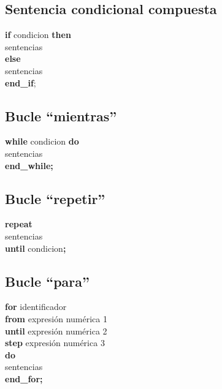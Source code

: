 \documentclass[a4paper,12pt,twoside,openright]{report}
\begin{document}
    \subsection{Sentencia condicional compuesta}
    \textbf{if} condicion \textbf{then}\\
      sentencias\\
    \textbf{else}\\
      sentencias\\
    \textbf{end\_if};
    \subsection{Bucle ``mientras''}
    \textbf{while} condicion \textbf{do}\\
      sentencias\\
    \textbf{end\_while;}\\
    \subsection{Bucle ``repetir''}
    \textbf{repeat}\\ 
    sentencias\\
    \textbf{until} condicion\textbf{;}\\
    
    \subsection{Bucle ``para''}
    \textbf{for} identificador\\
      \textbf{from} expresión numérica 1\\
      \textbf{until} expresión numérica 2\\
      \textbf{step} expresión numérica 3\\
    \textbf{do}\\
      sentencias\\
    \textbf{end\_for;}\\
  
  
\end{document}
